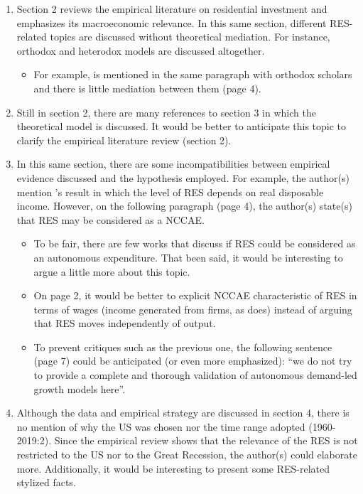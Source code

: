 \documentclass[11pt]{article}
\begin{document}
\begin{enumerate}
\item Section 2 reviews the empirical literature on residential investment and emphasizes its macroeconomic relevance. In this same section, different RES-related topics are discussed without theoretical mediation. For instance, orthodox and heterodox models are discussed altogether.
\begin{itemize}
\item For example, \textcite{arestis_economic_2019} is mentioned in the same paragraph with orthodox scholars and there is little mediation between them (page 4).
\end{itemize}
\item Still in section 2, there are many references to section 3 in which the theoretical model is discussed. It would be better to anticipate this topic to clarify the empirical literature review (section 2).
\item In this same section, there are some incompatibilities between empirical evidence discussed and the hypothesis employed. For example, the author(s) mention \citeauthor*{arestis_economic_2019}'s \citeyear{arestis_economic_2019} result in which the level of RES depends on real disposable income. However, on the following paragraph (page 4), the author(s) state(s) that RES may be considered as a NCCAE.

\begin{itemize}
\item To be fair, there are few works that discuss if RES could be considered as an autonomous expenditure. That been said, it would be interesting to argue a little more about this topic.
\item On page 2, it would be better to explicit NCCAE characteristic of RES in terms of wages (income generated from firms, as \textcite{serrano_long_1995} does) instead of arguing that RES moves independently of output.
\item To prevent critiques such as the previous one, the following sentence (page 7) could be anticipated (or even more emphasized): ``we do not try to provide a complete and thorough validation of autonomous demand-led growth models here''.
\end{itemize}

\item Although the data and empirical strategy are discussed in section 4, there is no mention of why the US was chosen nor the time range adopted (1960-2019:2). Since the empirical review shows that the relevance of the RES is not restricted to the US nor to the Great Recession, the author(s) could elaborate more. Additionally, it would be interesting to present some RES-related stylized facts.


\end{enumerate}
\end{document}
